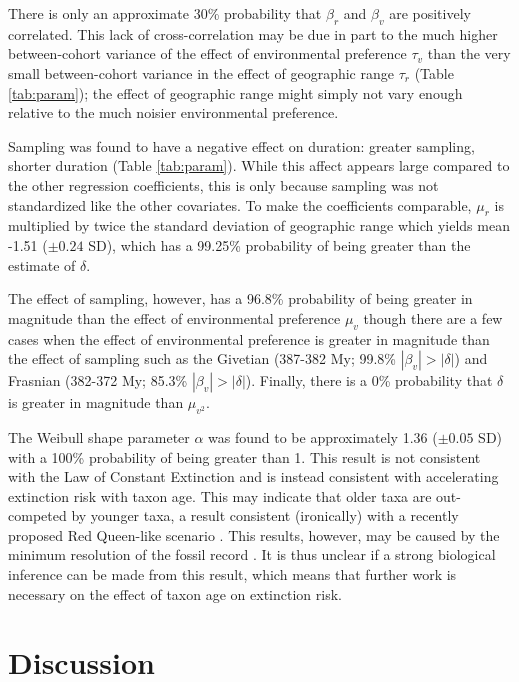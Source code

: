 \documentclass{article}
\begin{document}
There is only an approximate 30\% probability that \(\beta_{r}\) and \(\beta_{v}\) are positively correlated. This lack of cross-correlation may be due in part to the much higher between-cohort variance of the effect of environmental preference \(\tau_{v}\) than the very small between-cohort variance in the effect of geographic range \(\tau_{r}\) (Table \ref{tab:param}); the effect of geographic range might simply not vary enough relative to the much noisier environmental preference.

Sampling was found to have a negative effect on duration: greater sampling, shorter duration (Table \ref{tab:param}). While this affect appears large compared to the other regression coefficients, this is only because sampling was not standardized like the other covariates. To make the coefficients comparable, \(\mu_{r}\) is multiplied by twice the standard deviation of geographic range which yields mean -1.51 (\(\pm 0.24\) SD), which has a 99.25\% probability of being greater than the estimate of \(\delta\). 

The effect of sampling, however, has a 96.8\% probability of being greater in magnitude than the effect of environmental preference \(\mu_{v}\) though there are a few cases when the effect of environmental preference is greater in magnitude than the effect of sampling such as the Givetian (387-382 My; 99.8\% \(|\beta_{v}| > |\delta|\)) and Frasnian (382-372 My; 85.3\% \(|\beta_{v}| > |\delta|\)). Finally, there is a 0\% probability that \(\delta\) is greater in magnitude than \(\mu_{v^{2}}\).

The Weibull shape parameter \(\alpha\) was found to be approximately 1.36 (\(\pm 0.05\) SD) with a 100\% probability of being greater than 1. This result is not consistent with the Law of Constant Extinction \citep{VanValen1973} and is instead consistent with accelerating extinction risk with taxon age. This may indicate that older taxa are out-competed by younger taxa, a result consistent (ironically) with a recently proposed Red Queen-like scenario \citep{Rosindell2015a}. This results, however, may be caused by the minimum resolution of the fossil record \citep{Sepkoski1975}. It is thus unclear if a strong biological inference can be made from this result, which means that further work is necessary on the effect of taxon age on extinction risk.


\section{Discussion}
\end{document}
